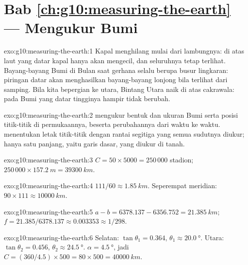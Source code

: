 \section*{Bab \ref{ch:g10:measuring-the-earth} --- Mengukur Bumi}

\begin{solution}{exo:g10:measuring-the-earth:1}
Kapal menghilang mulai dari lambungnya: di atas laut yang datar kapal hanya
akan mengecil, dan seluruhnya tetap terlihat. Bayang-bayang Bumi di Bulan saat
gerhana selalu berupa busur lingkaran: piringan datar akan menghasilkan
bayang-bayang lonjong bila terlihat dari samping. Bila kita bepergian ke
utara, Bintang Utara naik di atas cakrawala: pada Bumi yang datar tingginya
hampir tidak berubah.
\end{solution}

\begin{solution}{exo:g10:measuring-the-earth:2}
 mengukur bentuk dan ukuran Bumi serta posisi titik-titik di
permukaannya, beserta perubahannya dari waktu ke waktu. 
menentukan letak titik-titik dengan rantai segitiga yang semua sudutnya
diukur; hanya satu panjang, yaitu garis dasar, yang diukur di tanah.
\end{solution}

\begin{solution}{exo:g10:measuring-the-earth:3}
$C = 50 \times 5000 = 250\,000$ stadion; $250\,000 \times \qty{157.2}{m} =
\qty{39300}{km}$.
\end{solution}

\begin{solution}{exo:g10:measuring-the-earth:4}
$111/60 \approx \qty{1.85}{km}$. Seperempat meridian: $90 \times 111 \approx
\qty{10000}{km}$.
\end{solution}

\begin{solution}{exo:g10:measuring-the-earth:5}
$a - b = 6378.137 - 6356.752 = \qty{21.385}{km}$;
$f = 21.385/6378.137 \approx 0.003353 \approx 1/298$.
\end{solution}

\begin{solution}{exo:g10:measuring-the-earth:6}
Selatan: $\tan\theta_1 = 0.364$, $\theta_1 \approx \qty{20.0}{\degree}$. Utara:
$\tan\theta_2 = 0.456$, $\theta_2 \approx \qty{24.5}{\degree}$.
$\alpha = \qty{4.5}{\degree}$, jadi $C = (360/4.5) \times 500 = 80 \times 500 =
\qty{40000}{km}$.
\end{solution}


